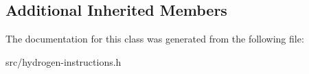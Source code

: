 \subsection*{Additional Inherited Members}


The documentation for this class was generated from the following file\+:\begin{DoxyCompactItemize}
\item 
src/hydrogen-\/instructions.\+h\end{DoxyCompactItemize}
